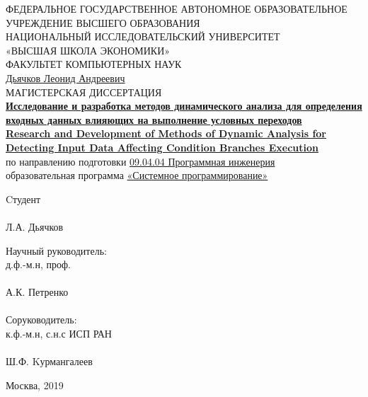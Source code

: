 \begin{titlepage}
	\begin{center}
	\textsc{\normalsize{ФЕДЕРАЛЬНОЕ ГОСУДАРСТВЕННОЕ АВТОНОМНОЕ ОБРАЗОВАТЕЛЬНОЕ}}\\
\textsc{\normalsize{УЧРЕЖДЕНИЕ ВЫСШЕГО ОБРАЗОВАНИЯ}}\\
\textsc{\normalsize{НАЦИОНАЛЬНЫЙ ИССЛЕДОВАТЕЛЬСКИЙ УНИВЕРСИТЕТ}}\\
\textsc{\normalsize{{«ВЫСШАЯ ШКОЛА ЭКОНОМИКИ»}}\\
	\normalsize{ФАКУЛЬТЕТ КОМПЬЮТЕРНЫХ НАУК}}
	\\[.5cm]
	\normalsize{\underline{Дьячков Леонид Андреевич}}\\[.5cm]

	\normalsize{МАГИСТЕРСКАЯ ДИССЕРТАЦИЯ}\\[.8cm]

	{\normalsize {\ul{\textbf{Исследование и разработка методов динамического анализа для определения входных данных влияющих на выполнение условных переходов}}}} \\[.3cm]
	{\normalsize {\ul{\textbf{Research and Development of Methods of Dynamic Analysis for Detecting Input Data Affecting Condition Branches Execution}}}}\\[.5cm]

	по направлению подготовки \underline{09.04.04 Программная инженерия}\\
	образовательная программа \underline{«Системное программирование»}

	\begin{flushleft}
	Cтудент\\
	\underline{\hspace{3cm}}\\
	Л.А. Дьячков\\
	\end{flushleft}
	\begin{flushright}
		
		Научный руководитель: \\ 
		д.ф.-м.н, проф. \\
		\underline{\hspace{3cm}}\\
		А.К. Петренко \\
		\\
		Соруководитель: \\ 
		к.ф.-м.н, с.н.с ИСП РАН \\
		\underline{\hspace{3cm}}\\
		Ш.Ф. Kурмангалеев \\
	\end{flushright}
	\vfill
	
	Москва, 2019
	\end{center}

\end{titlepage}


